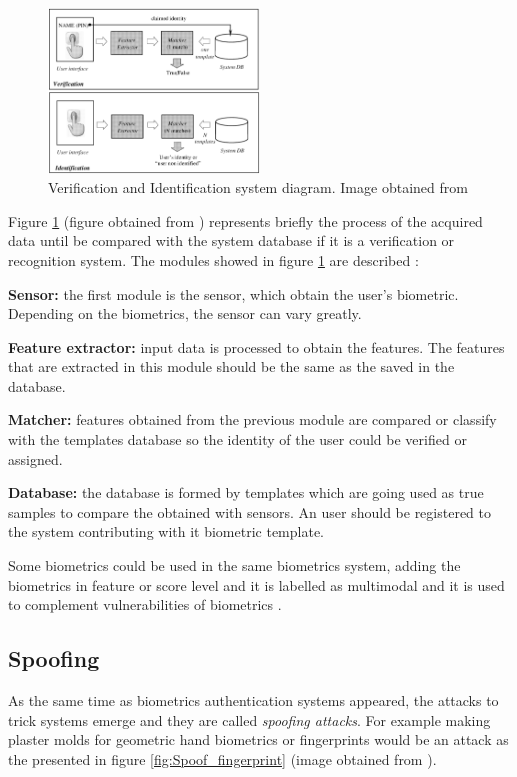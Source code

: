 \begin{figure}[htb]
\centering
\includegraphics[width=0.5\textwidth]{images_miscelaneus/verif_identif.PNG}
\caption{Verification and Identification system diagram. Image obtained from \cite{Intro_biometrics2}} \label{fig:Verif_ident}
\end{figure}

Figure \ref{fig:Verif_ident} (figure obtained from \cite{Intro_biometrics2}) represents briefly the process of the acquired data until be compared  with the system database if it is a verification or recognition system. The modules showed in figure \ref{fig:Verif_ident} are described \cite{Intro_biometrics2}: 
\begin{description}[noitemsep,topsep=8pt,parsep=0pt,partopsep=20pt]
\item \textbf{Sensor:} the first module is the sensor, which obtain the user's biometric. Depending on the biometrics, the sensor can vary greatly.
\item \textbf{Feature extractor:} input data is processed to obtain the features. The features that are extracted in this module should be the same as the saved in the database.
\item \textbf{Matcher:} features obtained from the previous module are compared or classify with the templates database so the identity of the user could be verified or assigned.
\item \textbf{Database:} the database is formed by templates which are going used as true samples to compare the obtained with sensors. An user should be registered to the system contributing with it biometric template. 
\end{description}

Some biometrics could be used in the same biometrics system, adding the biometrics in feature or score level and it is labelled as multimodal and it is used to complement vulnerabilities of biometrics \cite{Spoofing_survey}.

\subsection{Spoofing}
As the same time as biometrics authentication systems appeared, the attacks to trick systems emerge and they are called \textit{spoofing attacks}. For example making plaster molds for geometric hand biometrics or fingerprints would be an attack as the presented in figure \ref{fig:Spoof_fingerprint} (image obtained from \cite{fingerprint_image}).\\

